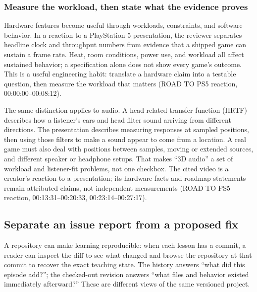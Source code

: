 \subsubsection{Measure the workload, then state what the evidence proves}\label{06-engine-ii-ch040-measure-the-workload-then-state-what-the-evidence-proves}

\hypertarget{06-engine-ii-ch040-measure-the-workload-then-state-what-the-evidence-proves}{}

Hardware features become useful through workloads, constraints, and software behavior. In a reaction to a PlayStation 5 presentation, the reviewer separates headline clock and throughput numbers from evidence that a shipped game can sustain a frame rate. Heat, room conditions, power use, and workload all affect sustained behavior; a specification alone does not show every game's outcome. This is a useful engineering habit: translate a hardware claim into a testable question, then measure the workload that matters (ROAD TO PS5 reaction, 00:00:00--00:08:12).

The same distinction applies to audio. A head-related transfer function (HRTF) describes how a listener's ears and head filter sound arriving from different directions. The presentation describes measuring responses at sampled positions, then using those filters to make a sound appear to come from a location. A real game must also deal with positions between samples, moving or extended sources, and different speaker or headphone setups. That makes ``3D audio'' a set of workload and listener-fit problems, not one checkbox. The cited video is a creator's reaction to a presentation; its hardware facts and roadmap statements remain attributed claims, not independent measurements (ROAD TO PS5 reaction, 00:13:31--00:20:33, 00:23:14--00:27:17).

\subsection{Separate an issue report from a proposed fix}\label{06-engine-ii-ch040-separate-an-issue-report-from-a-proposed-fix}

\hypertarget{06-engine-ii-ch040-separate-an-issue-report-from-a-proposed-fix}{}

A repository can make learning reproducible: when each lesson has a commit, a reader can inspect the diff to see what changed and browse the repository at that commit to recover the exact teaching state. The history answers ``what did this episode add?''; the checked-out revision answers ``what files and behavior existed immediately afterward?'' These are different views of the same versioned project.

